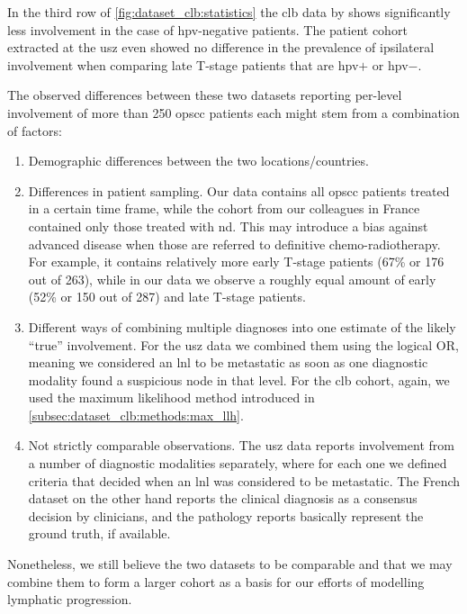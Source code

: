 \documentclass[\relativeRoot/main.tex]{subfiles}
\begin{document}
In the third row of \cref{fig:dataset_clb:statistics} the \gls{clb} data by  shows significantly less involvement in the case of \gls{hpv}-negative patients. The patient cohort extracted at the \gls{usz} even showed no difference in the prevalence of ipsilateral involvement when comparing late T-stage patients that are \gls{hpv}$+$ or \gls{hpv}$-$.

The observed differences between these two datasets reporting per-level involvement of more than 250 \gls{opscc} patients each might stem from a combination of factors:

\begin{enumerate}
    \item Demographic differences between the two locations/countries.
    \item Differences in patient sampling. Our data contains all \gls{opscc} patients treated in a certain time frame, while the cohort from our colleagues in France contained only those treated with \acrlong{nd}. This may introduce a bias against advanced disease when those are referred to definitive chemo-radiotherapy. For example, it contains relatively more early T-stage patients (67\% or 176 out of 263), while in our data we observe a roughly equal amount of early (52\% or 150 out of 287) and late T-stage patients.
    \item Different ways of combining multiple diagnoses into one estimate of the likely ``true'' involvement. For the \gls{usz} data we combined them using the logical OR, meaning we considered an \gls{lnl} to be metastatic as soon as one diagnostic modality found a suspicious node in that level. For the \gls{clb} cohort, again, we used the maximum likelihood method introduced in \cref{subsec:dataset_clb:methods:max_llh}.
    \item Not strictly comparable observations. The \gls{usz} data reports involvement from a number of diagnostic modalities separately, where for each one we defined criteria that decided when an \gls{lnl} was considered to be metastatic. The French dataset on the other hand reports the clinical diagnosis as a consensus decision by clinicians, and the pathology reports basically represent the ground truth, if available.
\end{enumerate}

Nonetheless, we still believe the two datasets to be comparable and that we may combine them to form a larger cohort as a basis for our efforts of modelling lymphatic progression. 
\end{document}
